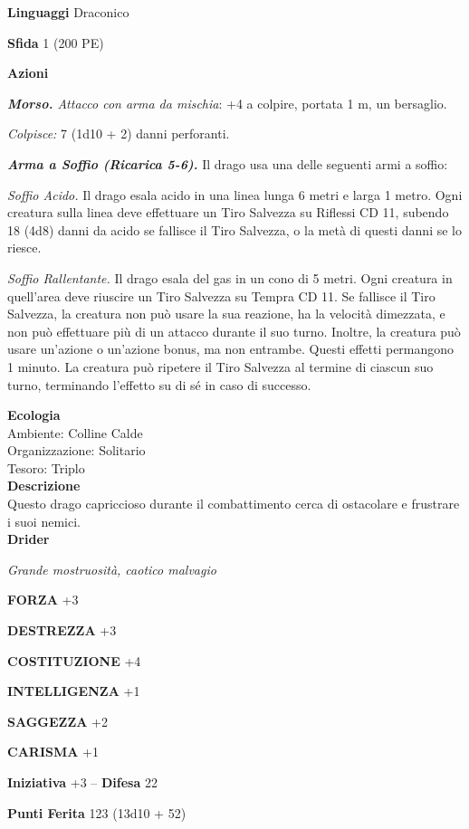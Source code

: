 \begin{multicols}{2}
\textbf{Linguaggi} Draconico

\textbf{Sfida} 1 (200 PE)

\textbf{Azioni}

\emph{\textbf{Morso.} Attacco con arma da mischia}: +4 a colpire, portata 1 m, un bersaglio.

\emph{Colpisce:} 7 (1d10 + 2) danni perforanti.

\emph{\textbf{Arma a Soffio (Ricarica 5-6).}} Il drago usa una delle seguenti armi a soffio:

\emph{Soffio Acido.} Il drago esala acido in una linea lunga 6 metri e larga 1 metro. Ogni creatura sulla linea deve effettuare un Tiro Salvezza su Riflessi CD 11, subendo 18 (4d8) danni da acido se fallisce il Tiro Salvezza, o la metà di questi danni se lo riesce.

\emph{Soffio Rallentante.} Il drago esala del gas in un cono di 5 metri. Ogni creatura in quell'area deve riuscire un Tiro Salvezza su Tempra CD 11. Se fallisce il Tiro Salvezza, la creatura non può usare la sua reazione, ha la velocità dimezzata, e non può effettuare più di un attacco durante il suo turno. Inoltre, la creatura può usare un'azione o un'azione bonus, ma non entrambe. Questi effetti permangono 1 minuto. La creatura può ripetere il Tiro Salvezza al termine di ciascun suo turno, terminando l'effetto su di sé in caso di successo.

\textbf{Ecologia}\\
Ambiente: Colline Calde\\
Organizzazione: Solitario\\
Tesoro: Triplo\\
\textbf{Descrizione}\\
Questo drago capriccioso durante il combattimento cerca di ostacolare e frustrare i suoi nemici.\\


\medskip{}\textbf{Drider}

\emph{Grande mostruosità, caotico malvagio}

\textbf{FORZA} +3

\textbf{DESTREZZA} +3

\textbf{COSTITUZIONE} +4

\textbf{INTELLIGENZA} +1

\textbf{SAGGEZZA} +2

\textbf{CARISMA} +1

\textbf{Iniziativa} +3 -- \textbf{Difesa} 22

\textbf{Punti Ferita} 123 (13d10 + 52)


\end{multicols}

